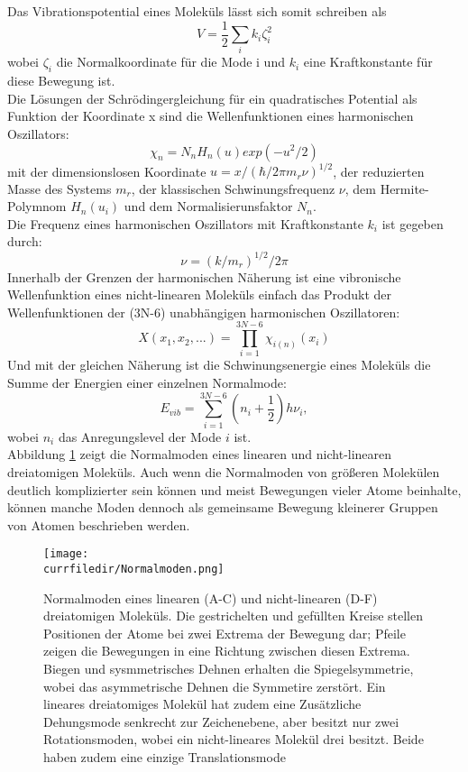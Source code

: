 Das Vibrationspotential eines Moleküls lässt sich somit schreiben als
\begin{equation}
    V = \frac{1}{2} \sum_i k_i \zeta_i^2
\end{equation}
wobei $\zeta_i$ die Normalkoordinate für die Mode i und $k_i$ eine Kraftkonstante für diese Bewegung ist. \\
Die Lösungen der Schrödingergleichung für ein quadratisches Potential als Funktion der Koordinate x sind die Wellenfunktionen eines harmonischen Oszillators:
\begin{equation}
    \chi_n = N_n H_n(u) exp(-u^2/2)
\end{equation}
mit der dimensionslosen Koordinate $u = x/(\hbar/2\pi m_r\nu)^{1/2}$, der reduzierten Masse des Systems $m_r$, der klassischen Schwinungsfrequenz $\nu$, dem Hermite-Polymnom $H_n(u_i)$ und dem Normalisierunsfaktor $N_n$. \\
Die Frequenz eines harmonischen Oszillators mit Kraftkonstante $k_i$ ist gegeben durch:
\begin{equation}
    \nu = (k/m_r)^{1/2}/2\pi
\end{equation}
Innerhalb der Grenzen der harmonischen Näherung ist eine vibronische Wellenfunktion eines nicht-linearen Moleküls einfach das Produkt der Wellenfunktionen der (3N-6) unabhängigen harmonischen Oszillatoren:
\begin{equation}
    X(x_1, x_2, ...) = \prod_{i=1}^{3N-6} \chi_{i(n)}(x_i)
\end{equation}
Und mit der gleichen Näherung ist die Schwinungsenergie eines Moleküls die Summe der Energien einer einzelnen Normalmode:
\begin{equation}
    E_{vib} = \sum_{i=1}^{3N-6}(n_i + \frac{1}{2})h\nu_i,
\end{equation}
wobei $n_i$ das Anregungslevel der Mode $i$ ist. \\
Abbildung \ref{fig_Normalmoden} zeigt die Normalmoden eines linearen und nicht-linearen dreiatomigen Moleküls. Auch wenn die Normalmoden von größeren Molekülen deutlich komplizierter sein können und meist Bewegungen vieler Atome beinhalte, können manche Moden dennoch als gemeinsame Bewegung kleinerer Gruppen von Atomen beschrieben werden.
\begin{figure}[htb]
    \centering
    \texttt{[image: \\currfiledir/Normalmoden.png]}
    \caption{Normalmoden eines linearen (A-C) und nicht-linearen (D-F) dreiatomigen Moleküls. Die gestrichelten und gefüllten Kreise stellen Positionen der Atome bei zwei Extrema der Bewegung dar; Pfeile zeigen die Bewegungen in eine Richtung zwischen diesen Extrema. Biegen und sysmmetrisches Dehnen erhalten die Spiegelsymmetrie, wobei das asymmetrische Dehnen die Symmetire zerstört. Ein lineares dreiatomiges Molekül hat zudem eine Zusätzliche Dehungsmode senkrecht zur Zeichenebene, aber besitzt nur zwei Rotationsmoden, wobei ein nicht-lineares Molekül drei besitzt. Beide haben zudem eine einzige Translationsmode}
    \label{fig_Normalmoden}
\end{figure}
